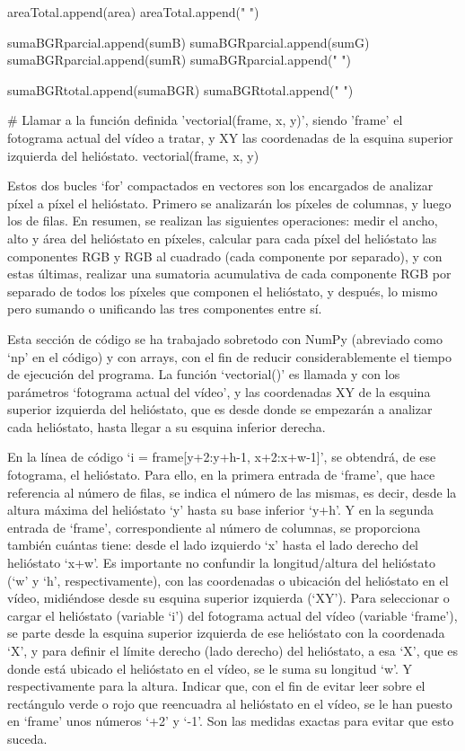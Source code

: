 \documentclass[12pt]{article}
\begin{document}
                areaTotal.append(area)
                areaTotal.append("                       ")
                
                sumaBGRparcial.append(sumB)
                sumaBGRparcial.append(sumG)
                sumaBGRparcial.append(sumR)
                sumaBGRparcial.append("     ")
                
                sumaBGRtotal.append(sumaBGR)
                sumaBGRtotal.append("                       ")

            \# Llamar a la función definida 'vectorial(frame, x, y)', siendo 'frame' el fotograma actual del vídeo a tratar, y XY las coordenadas de la esquina superior izquierda del helióstato.
            vectorial(frame, x, y)
        
Estos dos bucles ‘for’ compactados en vectores son los encargados de analizar píxel a píxel el helióstato. Primero se analizarán los píxeles de columnas, y luego los de filas. En resumen, se realizan las siguientes operaciones: medir el ancho, alto y área del helióstato en píxeles, calcular para cada píxel del helióstato las componentes RGB y RGB al cuadrado (cada componente por separado), y con estas últimas, realizar una sumatoria acumulativa de cada componente RGB por separado de todos los píxeles que componen el helióstato, y después, lo mismo pero sumando o unificando las tres componentes entre sí.

Esta sección de código se ha trabajado sobretodo con NumPy (abreviado como ‘np’ en el código) y con arrays, con el fin de reducir considerablemente el tiempo de ejecución del programa. La función ‘vectorial()’ es llamada y con los parámetros ‘fotograma actual del vídeo’, y las coordenadas XY de la esquina superior izquierda del helióstato, que es desde donde se empezarán a analizar cada helióstato, hasta llegar a su esquina inferior derecha.

En la línea de código ‘i = frame[y+2:y+h-1, x+2:x+w-1]’, se obtendrá, de ese fotograma, el helióstato. Para ello, en la primera entrada de ‘frame’, que hace referencia al número de filas, se indica el número de las mismas, es decir, desde la altura máxima del helióstato ‘y’ hasta su base inferior ‘y+h’. Y en la segunda entrada de ‘frame’, correspondiente al número de columnas, se proporciona también cuántas tiene: desde el lado izquierdo ‘x’ hasta el lado derecho del helióstato ‘x+w’. Es importante no confundir la longitud/altura del helióstato (‘w’ y ‘h’, respectivamente), con las coordenadas o ubicación del helióstato en el vídeo, midiéndose desde su esquina superior izquierda (‘XY’). Para seleccionar o cargar el helióstato (variable ‘i’) del fotograma actual del vídeo (variable ‘frame’), se parte desde la esquina superior izquierda de ese helióstato con la coordenada ‘X’, y para definir el límite derecho (lado derecho) del helióstato, a esa ‘X’, que es donde está ubicado el helióstato en el vídeo, se le suma su longitud ‘w’. Y respectivamente para la altura. Indicar que, con el fin de evitar leer sobre el rectángulo verde o rojo que reencuadra al helióstato en el vídeo, se le han puesto en ‘frame’ unos números ‘+2’ y ‘-1’. Son las medidas exactas para evitar que esto suceda.
\end{document}
